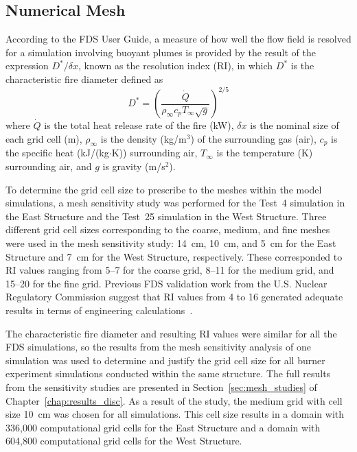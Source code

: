 \subsection{Numerical Mesh}
\label{subsec:mesh}
According to the FDS User Guide, a measure of how well the flow field is resolved for a simulation involving buoyant plumes is provided by the result of the expression $D^*/\delta x$, known as the resolution index (RI), in which $D^*$ is the characteristic fire diameter defined as
\begin{equation}
\label{eq:Dstar}
	D^* = \left( \frac{\dot{Q}}{\rho_\infty c_p T_\infty \sqrt{g}}\right)^{2/5}
\end{equation}
where $\dot{Q}$ is the total heat release rate of the fire (kW), $\delta x$ is the nominal size of each grid cell (m), $\rho_\infty$ is the density (kg/m$^3$) of the surrounding gas (air), $c_p$ is the specific heat (kJ/(kg$\cdot$K)) surrounding air, $T_\infty$ is the temperature (K) surrounding air, and $g$ is gravity (m/s$^2$). 

To determine the grid cell size to prescribe to the meshes within the model simulations, a mesh sensitivity study was performed for the Test~4 simulation in the East Structure and the Test~25 simulation in the West Structure. Three different grid cell sizes corresponding to the coarse, medium, and fine meshes were used in the mesh sensitivity study: 14~cm, 10~cm, and 5~cm for the East Structure and 7~cm for the West Structure, respectively. These corresponded to RI values ranging from 5--7 for the coarse grid, 8--11 for the medium grid, and 15--20 for the fine grid. Previous FDS validation work from the U.S. Nuclear Regulatory Commission suggest that RI values from 4 to 16 generated adequate results in terms of engineering calculations~\cite{NUREG_1824}.

The characteristic fire diameter and resulting RI values were similar for all the FDS simulations, so the results from the mesh sensitivity analysis of one simulation was used to determine and justify the grid cell size for all burner experiment simulations conducted within the same structure. The full results from the sensitivity studies are presented in Section~\ref{sec:mesh_studies} of Chapter~\ref{chap:results_disc}. As a result of the study, the medium grid with cell size 10~cm was chosen for all simulations. This cell size results in a domain with 336,000 computational grid cells for the East Structure and a domain with 604,800 computational grid cells for the West Structure.

